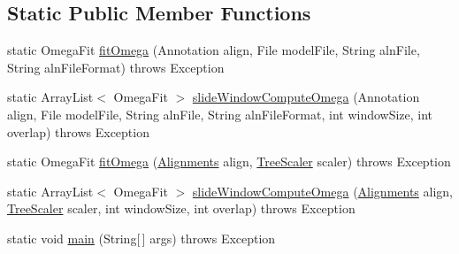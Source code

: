 \subsection*{Static Public Member Functions}
\begin{DoxyCompactItemize}
\item 
static Omega\+Fit \hyperlink{classbroad_1_1core_1_1siphy_1_1tools_1_1conservation_1_1_estimate_omega_per_exon_ad1589e788f50fe1a41b94463f1e9650f}{fit\+Omega} (Annotation align, File model\+File, String aln\+File, String aln\+File\+Format)  throws Exception
\item 
static Array\+List$<$ Omega\+Fit $>$ \hyperlink{classbroad_1_1core_1_1siphy_1_1tools_1_1conservation_1_1_estimate_omega_per_exon_a6d13fa071903b8908760f11a7186d824}{slide\+Window\+Compute\+Omega} (Annotation align, File model\+File, String aln\+File, String aln\+File\+Format, int window\+Size, int overlap)  throws Exception
\item 
static Omega\+Fit \hyperlink{classbroad_1_1core_1_1siphy_1_1tools_1_1conservation_1_1_estimate_omega_per_exon_aa8e717426e09a491f6d2333f87134c96}{fit\+Omega} (\hyperlink{classbroad_1_1pda_1_1datastructures_1_1_alignments}{Alignments} align, \hyperlink{classbroad_1_1core_1_1siphy_1_1_tree_scaler}{Tree\+Scaler} scaler)  throws Exception
\item 
static Array\+List$<$ Omega\+Fit $>$ \hyperlink{classbroad_1_1core_1_1siphy_1_1tools_1_1conservation_1_1_estimate_omega_per_exon_a302e6da8ef72899af2754209c83ccca0}{slide\+Window\+Compute\+Omega} (\hyperlink{classbroad_1_1pda_1_1datastructures_1_1_alignments}{Alignments} align, \hyperlink{classbroad_1_1core_1_1siphy_1_1_tree_scaler}{Tree\+Scaler} scaler, int window\+Size, int overlap)  throws Exception
\item 
static void \hyperlink{classbroad_1_1core_1_1siphy_1_1tools_1_1conservation_1_1_estimate_omega_per_exon_a02888701d6e68016d609ee5570a1d7b8}{main} (String\mbox{[}$\,$\mbox{]} args)  throws Exception
\end{DoxyCompactItemize}


